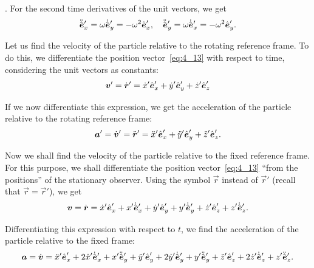 . For the second time derivatives of the unit vectors, we get
\begin{equation}\label{eq:4_15}
\ddot{\hat{\boldsymbol{e}}}_x' = \omega\dot{\hat{\boldsymbol{e}}}_y' = -\omega^2\hat{\boldsymbol{e}}_{x}',\quad \ddot{\hat{\boldsymbol{e}}}_y' = \omega\dot{\hat{\boldsymbol{e}}}_x' = -\omega^2\hat{\boldsymbol{e}}_{y}'.
\end{equation}

Let us find the velocity of the particle relative to the rotating reference frame. To do this, we differentiate the position vector~\eqref{eq:4_13} with respect to time, considering the unit vectors as constants:
\begin{equation}\label{eq:4_16}
\boldsymbol{v}' = \dot{\boldsymbol{r}}' = \dot{x}'\hat{\boldsymbol{e}}_{x}' + \dot{y}'\hat{\boldsymbol{e}}_{y}' + \dot{z}'\hat{\boldsymbol{e}}_{z}'
\end{equation}

\noindent
If we now differentiate this expression, we get the acceleration of the particle relative to the rotating reference frame:
\begin{equation}\label{eq:4_17}
\boldsymbol{a}' = \dot{\boldsymbol{v}}' = \ddot{\boldsymbol{r}}' = \ddot{x}'\hat{\boldsymbol{e}}_{x}' + \ddot{y}'\hat{\boldsymbol{e}}_{y}' + \ddot{z}'\hat{\boldsymbol{e}}_{z}'.
\end{equation}

Now we shall find the velocity of the particle relative to the fixed reference frame. For this purpose, we shall differentiate the position vector~\eqref{eq:4_13} ``from the positions'' of the stationary observer. Using the symbol $\vec{r}$ instead of $\vec{r}'$ (recall that $\vec{r}=\vec{r}'$), we get
\begin{equation}\label{eq:4_18}
\boldsymbol{v} = \dot{\boldsymbol{r}} = \dot{x}'\hat{\boldsymbol{e}}_{x}' + x'\dot{\hat{\boldsymbol{e}}}_x' + \dot{y}'\hat{\boldsymbol{e}}_{y}' + y'\dot{\hat{\boldsymbol{e}}}_y' + \dot{z}'\hat{\boldsymbol{e}}_{z}' + z'\dot{\hat{\boldsymbol{e}}}_z'.
\end{equation}

\noindent
Differentiating this expression with respect to $t$, we find the acceleration of the particle relative to the fixed frame:
\begin{equation*}
\boldsymbol{a} = \dot{\boldsymbol{v}} =
\ddot{x}'\hat{\boldsymbol{e}}_{x}' + 2\dot{x}'\dot{\hat{\boldsymbol{e}}}_x' + x'\ddot{\hat{\boldsymbol{e}}}_y' + \ddot{y}'\hat{\boldsymbol{e}}_{y}' + 2\dot{y}'\dot{\hat{\boldsymbol{e}}}_y' + y'\ddot{\hat{\boldsymbol{e}}}_y' + \ddot{z}'\hat{\boldsymbol{e}}_{z}' + 2\dot{z}'\dot{\hat{\boldsymbol{e}}}_z' + z'\ddot{\hat{\boldsymbol{e}}}_z'.
\end{equation*}

